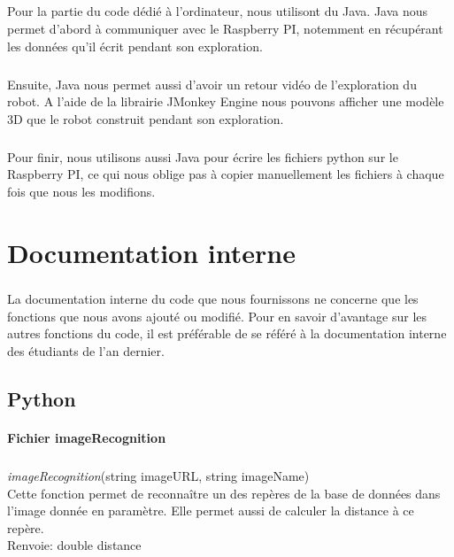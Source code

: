 \documentclass[12pt]{report}
\begin{document}
\paragraph{}
Pour la partie du code dédié à l'ordinateur, nous utilisont du Java. Java nous permet d'abord à communiquer avec le Raspberry PI, notemment en récupérant les données qu'il écrit pendant son exploration.

\paragraph{}
Ensuite, Java nous permet aussi d'avoir un retour vidéo de l'exploration du robot. A l'aide de la librairie JMonkey Engine nous pouvons afficher une modèle 3D que le robot construit pendant son exploration.

\paragraph{}
Pour finir, nous utilisons aussi Java pour écrire les fichiers python sur le Raspberry PI, ce qui nous oblige pas à copier manuellement les fichiers à chaque fois que nous les modifions.

\chapter{Documentation interne}
\paragraph{}
La documentation interne du code que nous fournissons ne concerne que les fonctions que nous avons ajouté ou modifié. Pour en savoir d'avantage sur les autres fonctions du code, il est préférable de se référé à la documentation interne des étudiants de l'an dernier.

\section{Python}

\subsubsection{Fichier imageRecognition}
\paragraph{}
\textit{imageRecognition}(string imageURL, string imageName)\\
Cette fonction permet de reconnaître un des repères de la base de données dans l'image donnée en paramètre. Elle permet aussi de calculer la distance à ce repère.\\
Renvoie: double distance
\end{document}
